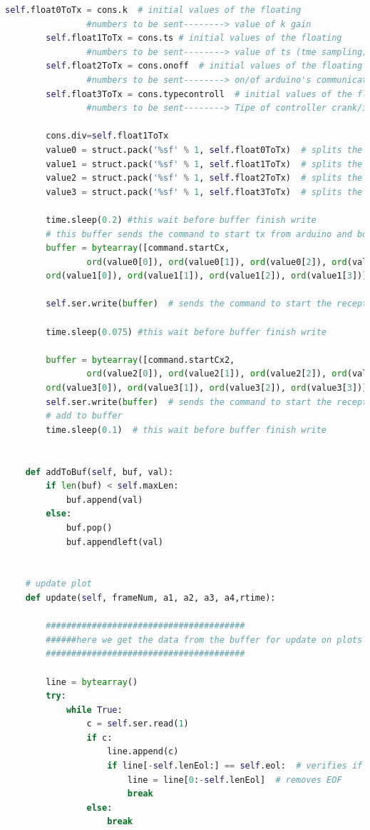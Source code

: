 {\begin{lstlisting}[language=python]
        self.float0ToTx = cons.k  # initial values of the floating
				#numbers to be sent--------> value of k gain
        self.float1ToTx = cons.ts # initial values of the floating
				#numbers to be sent--------> value of ts (tme sampling) 10-50 ms
        self.float2ToTx = cons.onoff  # initial values of the floating 
				#numbers to be sent--------> on/of arduino's communication
        self.float3ToTx = cons.typecontroll  # initial values of the floating 
				#numbers to be sent--------> Tipe of controller crank/inverted

        cons.div=self.float1ToTx
        value0 = struct.pack('%sf' % 1, self.float0ToTx)  # splits the float value into 4 strings
        value1 = struct.pack('%sf' % 1, self.float1ToTx)  # splits the float value into 4 strings
        value2 = struct.pack('%sf' % 1, self.float2ToTx)  # splits the float value into 4 strings
        value3 = struct.pack('%sf' % 1, self.float3ToTx)  # splits the float value into 4 strings

        time.sleep(0.2) #this wait before buffer finish write
        # this buffer sends the command to start tx from arduino and both floating registers
        buffer = bytearray([command.startCx,
				ord(value0[0]), ord(value0[1]), ord(value0[2]), ord(value0[3]),
        ord(value1[0]), ord(value1[1]), ord(value1[2]), ord(value1[3])])

        self.ser.write(buffer)  # sends the command to start the reception

        time.sleep(0.075) #this wait before buffer finish write

        buffer = bytearray([command.startCx2,
				ord(value2[0]), ord(value2[1]), ord(value2[2]), ord(value2[3]),
        ord(value3[0]), ord(value3[1]), ord(value3[2]), ord(value3[3])])
        self.ser.write(buffer)  # sends the command to start the reception
        # add to buffer
        time.sleep(0.1)  # this wait before buffer finish write


    def addToBuf(self, buf, val):
        if len(buf) < self.maxLen:
            buf.append(val)
        else:
            buf.pop()
            buf.appendleft(val)


    # update plot
    def update(self, frameNum, a1, a2, a3, a4,rtime):

        #######################################
        ######here we get the data from the buffer for update on plots #####
        #######################################

        line = bytearray()
        try:
            while True:
                c = self.ser.read(1)
                if c:
                    line.append(c)
                    if line[-self.lenEol:] == self.eol:  # verifies if EOF has been received
                        line = line[0:-self.lenEol]  # removes EOF
                        break
                else:
                    break


\end{lstlisting}}
